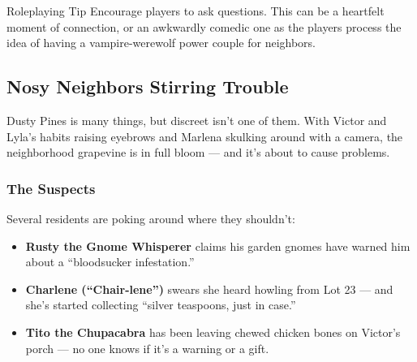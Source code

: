 \begin{CommentBox}{Roleplaying Tip}
    Encourage players to ask questions. This can be a heartfelt moment of connection, or an awkwardly comedic one as the players process the idea of having a vampire-werewolf power couple for neighbors.
\end{CommentBox}


\subsection{Nosy Neighbors Stirring Trouble}

Dusty Pines is many things, but discreet isn’t one of them. With Victor and Lyla’s habits raising eyebrows and Marlena skulking around with a camera, the neighborhood grapevine is in full bloom — and it’s about to cause problems.

\subsubsection*{The Suspects}
Several residents are poking around where they shouldn’t:
\begin{itemize}
    \item \textbf{Rusty the Gnome Whisperer} claims his garden gnomes have warned him about a “bloodsucker infestation.”
    \item \textbf{Charlene (“Chair-lene”)} swears she heard howling from Lot 23 — and she’s started collecting “silver teaspoons, just in case.”
    \item \textbf{Tito the Chupacabra} has been leaving chewed chicken bones on Victor’s porch — no one knows if it's a warning or a gift.
\end{itemize}

